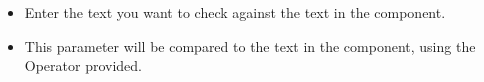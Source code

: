 \begin{itemize}
\item Enter the text you want to check against the text in the component.
\item This parameter will be compared to the text in the component, using the Operator provided.
\end{itemize}
